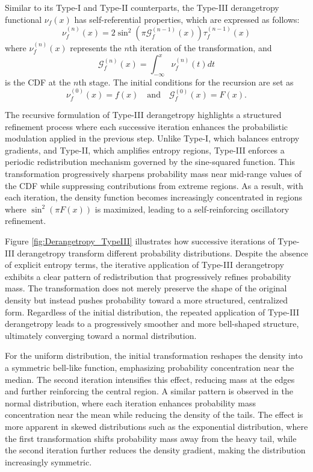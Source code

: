 \documentclass[sn-mathphys-num]{sn-jnl}%
\theoremstyle{thmstyleone}%
\theoremstyle{thmstyletwo}%
\theoremstyle{thmstylethree}%
\begin{document}
Similar to its Type-I and Type-II counterparts, the Type-III derangetropy functional $\nu_f(x)$ has self-referential properties, which are expressed as follows: 
$$
\nu_f^{(n)}(x)=2 \sin^2 \left(\pi \mathcal{G}_f^{(n-1)}(x)\right) \tau_f^{(n-1)}(x)
$$
where $\nu_f^{(n)}(x)$ represents the $n$th iteration of the transformation, and
$$
\mathcal{G}_f^{(n)}(x)=\int_{-\infty}^x \nu_f^{(n)}(t) d t
$$
is the CDF at the $n$th stage. The initial conditions for the recursion are set as
$$
\nu_f^{(0)}(x)=f(x) \quad \text{and} \quad \mathcal{G}_f^{(0)}(x)=F(x).
$$

The recursive formulation of Type-III derangetropy highlights a structured refinement process where each successive iteration enhances the probabilistic modulation applied in the previous step. Unlike Type-I, which balances entropy gradients, and Type-II, which amplifies entropy regions, Type-III enforces a periodic redistribution mechanism governed by the sine-squared function. This transformation progressively sharpens probability mass near mid-range values of the CDF while suppressing contributions from extreme regions. As a result, with each iteration, the density function becomes increasingly concentrated in regions where $\sin ^2(\pi F(x))$ is maximized, leading to a self-reinforcing oscillatory refinement.

Figure \ref{fig:Derangetropy_TypeIII} illustrates how successive iterations of Type-III derangetropy transform different probability distributions. Despite the absence of explicit entropy terms, the iterative application of Type-III derangetropy exhibits a clear pattern of redistribution that progressively refines probability mass. The transformation does not merely preserve the shape of the original density but instead pushes probability toward a more structured, centralized form. Regardless of the initial distribution, the repeated application of Type-III derangetropy leads to a progressively smoother and more bell-shaped structure, ultimately converging toward a normal distribution.

For the uniform distribution, the initial transformation reshapes the density into a symmetric bell-like function, emphasizing probability concentration near the median. The second iteration intensifies this effect, reducing mass at the edges and further reinforcing the central region. A similar pattern is observed in the normal distribution, where each iteration enhances probability mass concentration near the mean while reducing the density of the tails. The effect is more apparent in skewed distributions such as the exponential distribution, where the first transformation shifts probability mass away from the heavy tail, while the second iteration further reduces the density gradient, making the distribution increasingly symmetric.
\end{document}
